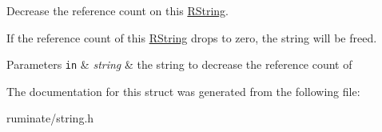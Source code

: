 Decrease the reference count on this \hyperlink{struct_r_string}{R\-String}. 

If the reference count of this \hyperlink{struct_r_string}{R\-String} drops to zero, the string will be freed. 
\begin{DoxyParams}[1]{Parameters}
\mbox{\tt in}  & {\em string} & the string to decrease the reference count of \\
\hline
\end{DoxyParams}


The documentation for this struct was generated from the following file\-:\begin{DoxyCompactItemize}
\item 
ruminate/string.\-h\end{DoxyCompactItemize}
